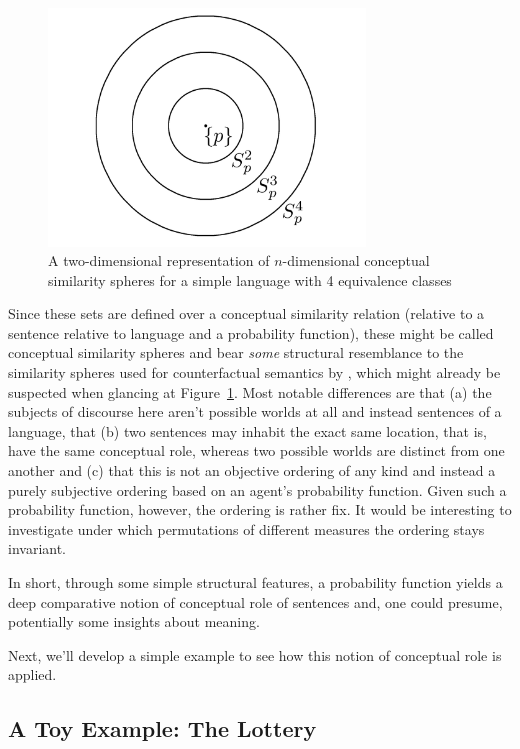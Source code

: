 \documentclass[11pt, a4paper]{scrartcl}
\renewcommand{\i}[1]{\emph{#1}}
\begin{document}
\begin{figure}
	\centering
    \includegraphics[width=0.75\textwidth]{Similarityspheres.png}
    \caption{A two-dimensional representation of $n$-dimensional conceptual similarity spheres for a simple language with 4 equivalence classes\label{fig:spheres}}
\end{figure}

Since these sets are defined over a conceptual similarity relation (relative to a sentence relative to language and a probability function), these might be called conceptual similarity spheres and bear \i{some} structural resemblance to the similarity spheres used for counterfactual semantics by \textcite{Lewis1973-LEWC-2}, which might already be suspected when glancing at Figure~\ref{fig:spheres}. Most notable differences are that (a) the subjects of discourse here aren't possible worlds at all and instead sentences of a language, that (b) two sentences may inhabit the exact same location, that is, have the same conceptual role, whereas two possible worlds are distinct from one another and (c) that this is not an objective ordering of any kind and instead a purely subjective ordering based on an agent's probability function. Given such a probability function, however, the ordering is rather fix. It would be interesting to investigate under which permutations of different measures the ordering stays invariant.

In short, through some simple structural features, a probability function yields a deep comparative notion of conceptual role of sentences and, one could presume, potentially some insights about meaning.

Next, we'll develop a simple example to see how this notion of conceptual role is applied.

\subsection{A Toy Example: The Lottery}
\end{document}
